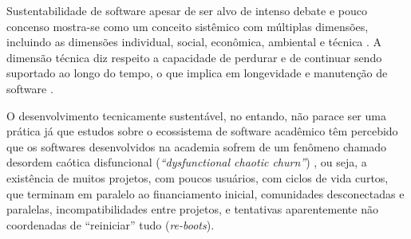 Sustentabilidade de software apesar de ser alvo de intenso debate e pouco
concenso mostra-se como um conceito sistêmico com múltiplas dimensões,
incluindo as dimensões individual, social, econômica, ambiental e técnica
\cite{becker2014karlskrona}. A dimensão técnica diz respeito a capacidade de
perdurar e de continuar sendo suportado ao longo do tempo, o que implica em
longevidade e manutenção de software \cite{venters2014software}.





O desenvolvimento tecnicamente sustentável, no entando, não parace ser uma
prática já que estudos sobre o ecossistema de software acadêmico têm percebido
que os softwares desenvolvidos na academia sofrem de um fenômeno chamado
desordem caótica disfuncional ({\it ``dysfunctional chaotic churn''})
\cite{howison2015understanding}, ou seja, a existência de muitos projetos, com
poucos usuários, com ciclos de vida curtos, que terminam em paralelo ao
financiamento inicial, comunidades desconectadas e paralelas,
incompatibilidades entre projetos, e tentativas aparentemente não coordenadas
de ``reiniciar'' tudo ({\it re-boots}).


